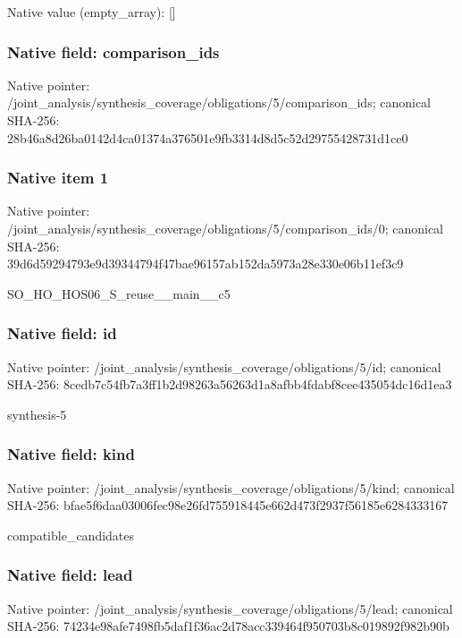 \documentclass[10pt,a4paper]{article}
\begin{document}
Native value (empty\_\allowbreak{}array): []

\subsubsection{Native field: comparison\_\allowbreak{}ids}
Native pointer: /joint\_\allowbreak{}analysis/synthesis\_\allowbreak{}coverage/obligations/5/comparison\_\allowbreak{}ids; canonical SHA-256: 28b46a8d26ba0142d4ca01374a376501e9fb3314d8d5c52d29755428731d1ce0

\subsubsection{Native item 1}
Native pointer: /joint\_\allowbreak{}analysis/synthesis\_\allowbreak{}coverage/obligations/5/comparison\_\allowbreak{}ids/0; canonical SHA-256: 39d6d59294793e9d39344794f47bae96157ab152da5973a28e330e06b11ef3c9

\begingroup\raggedright\sloppy SO\_\allowbreak{}HO\_\allowbreak{}HOS06\_\allowbreak{}S\_\allowbreak{}reuse\_\allowbreak{}\_\allowbreak{}main\_\allowbreak{}\_\allowbreak{}c5\par\endgroup

\subsubsection{Native field: id}
Native pointer: /joint\_\allowbreak{}analysis/synthesis\_\allowbreak{}coverage/obligations/5/id; canonical SHA-256: 8cedb7c54fb7a3ff1b2d98263a56263d1a8afbb4fdabf8cee435054dc16d1ea3

\begingroup\raggedright\sloppy synthesis-5\par\endgroup

\subsubsection{Native field: kind}
Native pointer: /joint\_\allowbreak{}analysis/synthesis\_\allowbreak{}coverage/obligations/5/kind; canonical SHA-256: bfae5f6daa03006fec98e26fd755918445e662d473f2937f56185e6284333167

\begingroup\raggedright\sloppy compatible\_\allowbreak{}candidates\par\endgroup

\subsubsection{Native field: lead}
Native pointer: /joint\_\allowbreak{}analysis/synthesis\_\allowbreak{}coverage/obligations/5/lead; canonical SHA-256: 74234e98afe7498fb5daf1f36ac2d78acc339464f950703b8c019892f982b90b
\end{document}
